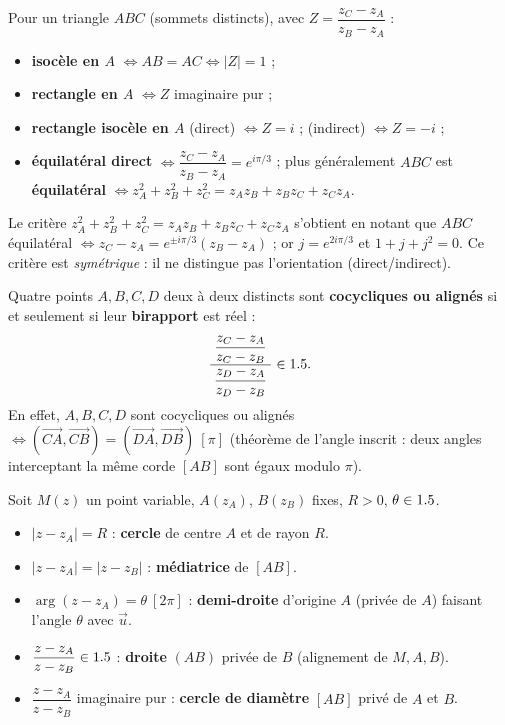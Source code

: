 \begin{propriete}
Pour un triangle $ABC$ (sommets distincts), avec $Z=\dfrac{z_C-z_A}{z_B-z_A}$ :
\begin{itemize}
\item \textbf{isocèle en $A$} $\iff AB=AC\iff |Z|=1$ ;
\item \textbf{rectangle en $A$} $\iff Z$ imaginaire pur ;
\item \textbf{rectangle isocèle en $A$} (direct) $\iff Z=i$ ; (indirect) $\iff Z=-i$ ;
\item \textbf{équilatéral direct} $\iff \dfrac{z_C-z_A}{z_B-z_A}=e^{i\pi/3}$ ; plus généralement $ABC$ est
\textbf{équilatéral} $\iff z_A^{2}+z_B^{2}+z_C^{2}=z_Az_B+z_Bz_C+z_Cz_A$.
\end{itemize}
\end{propriete}

\begin{remarque}
Le critère $z_A^2+z_B^2+z_C^2=z_Az_B+z_Bz_C+z_Cz_A$ s'obtient en notant que $ABC$ équilatéral
$\iff z_C-z_A=e^{\pm i\pi/3}(z_B-z_A)$ ; or $j=e^{2i\pi/3}$ et $1+j+j^2=0$. Ce critère est
\emph{symétrique} : il ne distingue pas l'orientation (direct/indirect).
\end{remarque}

\begin{theoreme}
Quatre points $A,B,C,D$ deux à deux distincts sont \textbf{cocycliques ou alignés} si et
seulement si leur \textbf{birapport} est réel :
\[
\frac{\;\dfrac{z_C-z_A}{z_C-z_B}\;}{\;\dfrac{z_D-z_A}{z_D-z_B}\;}\in1.5.
\]
En effet, $A,B,C,D$ sont cocycliques ou alignés $\iff (\overrightarrow{CA},\overrightarrow{CB})=(\overrightarrow{DA},\overrightarrow{DB})\ [\pi]$
(théorème de l'angle inscrit : deux angles interceptant la même corde $[AB]$ sont égaux modulo $\pi$).
\end{theoreme}

\begin{propriete}
Soit $M(z)$ un point variable, $A(z_A)$, $B(z_B)$ fixes, $R>0$, $\theta\in1.5$.
\begin{itemize}
\item $|z-z_A|=R$ : \textbf{cercle} de centre $A$ et de rayon $R$.
\item $|z-z_A|=|z-z_B|$ : \textbf{médiatrice} de $[AB]$.
\item $\arg(z-z_A)=\theta\ [2\pi]$ : \textbf{demi-droite} d'origine $A$ (privée de $A$) faisant l'angle $\theta$ avec $\vec u$.
\item $\dfrac{z-z_A}{z-z_B}\in1.5$ : \textbf{droite} $(AB)$ privée de $B$ (alignement de $M,A,B$).
\item $\dfrac{z-z_A}{z-z_B}$ imaginaire pur : \textbf{cercle de diamètre} $[AB]$ privé de $A$ et $B$.
\end{itemize}
\end{propriete}

